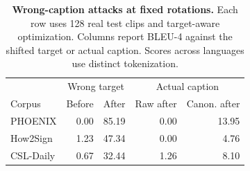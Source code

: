 \begin{table}[t]
\centering\small
\caption{\textbf{Wrong-caption attacks at fixed rotations.} Each row uses 128 real test clips and target-aware optimization. Columns report BLEU-4 against the shifted target or actual caption. Scores across languages use distinct tokenization.}
\label{tab:wrongtargets}
\begin{tabular}{lrrrr}\toprule
&\multicolumn{2}{c}{Wrong target}&\multicolumn{2}{c}{Actual caption}\\
Corpus&Before&After&Raw after&Canon. after\\\midrule
PHOENIX&0.00&85.19&0.00&13.95\\
How2Sign&1.23&47.34&0.00&4.76\\
CSL-Daily&0.67&32.44&1.26&8.10\\
\bottomrule\end{tabular}\end{table}
